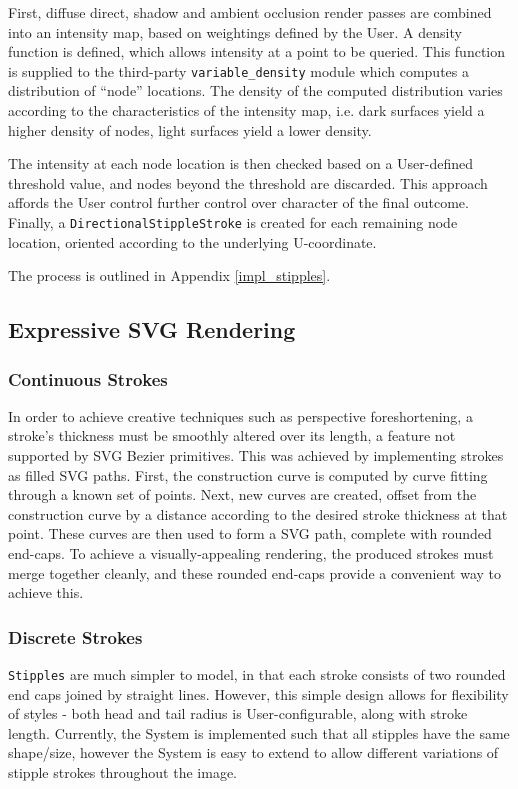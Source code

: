 {First, diffuse direct, shadow and ambient occlusion render passes are combined into an intensity map, based on weightings defined by the User.
A density function is defined, which allows intensity at a point to be queried.
This function is supplied to the third-party \texttt{variable\_density} module which computes a distribution of ``node'' locations.
The density of the computed distribution varies according to the characteristics of the intensity map, i.e. dark surfaces yield a higher density of nodes, light surfaces yield a lower density.

The intensity at each node location is then checked based on a User-defined threshold value, and nodes beyond the threshold are discarded.
This approach affords the User control further control over character of the final outcome.
Finally, a \texttt{DirectionalStippleStroke} is created for each remaining node location, oriented according to the underlying U-coordinate.

The process is outlined in Appendix \ref{impl_stipples}.

\subsection{Expressive SVG Rendering}

\subsubsection{Continuous Strokes}

In order to achieve creative techniques such as perspective foreshortening, a stroke’s thickness must be smoothly altered over its length, a feature not supported by SVG Bezier primitives. 
This was achieved by implementing strokes as filled SVG paths.
First, the construction curve is computed by curve fitting through a known set of points.
Next, new curves are created, offset from the construction curve by a distance according to the desired stroke thickness at that point.
These curves are then used to form a SVG path, complete with rounded end-caps.
To achieve a visually-appealing rendering, the produced strokes must merge together cleanly, and these rounded end-caps provide a convenient way to achieve this.

\subsubsection{Discrete Strokes}

\texttt{Stipples} are much simpler to model, in that each stroke consists of two rounded end caps joined by straight lines.
However, this simple design allows for flexibility of styles - both head and tail radius is User-configurable, along with stroke length.
Currently, the System is implemented such that all stipples have the same shape/size, however the System is easy to extend to allow different variations of stipple strokes throughout the image.

}
